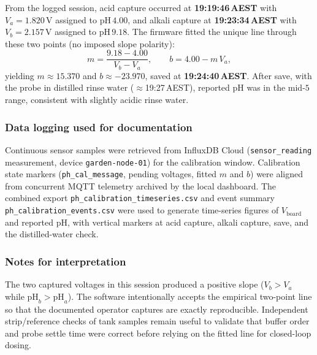 From the logged session, acid capture occurred at
\textbf{19:19:46\,AEST} with
$V_a = 1.820\,\mathrm{V}$ assigned to $\mathrm{pH}\,4.00$, and alkali
capture at \textbf{19:23:34\,AEST} with
$V_b = 2.157\,\mathrm{V}$ assigned to $\mathrm{pH}\,9.18$.
The firmware fitted the unique line through these two points
(no imposed slope polarity):
\begin{equation}
  m = \frac{9.18-4.00}{V_b-V_a},\qquad
  b = 4.00 - m\,V_a,
\end{equation}
yielding $m \approx 15.370$ and $b \approx -23.970$, saved at
\textbf{19:24:40\,AEST}. After save, with the probe in distilled rinse water
(\(\approx\)19:27\,AEST), reported $\mathrm{pH}$ was in the mid-$5$ range,
consistent with slightly acidic rinse water.

\subsubsection{Data logging used for documentation}
Continuous sensor samples were retrieved from InfluxDB Cloud
(\texttt{sensor\_reading} measurement, device \texttt{garden-node-01}) for
the calibration window. Calibration state markers
(\texttt{ph\_cal\_message}, pending voltages, fitted $m$ and $b$) were
aligned from concurrent MQTT telemetry archived by the local dashboard.
The combined export
\texttt{ph\_calibration\_timeseries.csv} and event summary
\texttt{ph\_calibration\_events.csv} were used to generate time-series
figures of $V_{\mathrm{board}}$ and reported $\mathrm{pH}$, with vertical
markers at acid capture, alkali capture, save, and the distilled-water
check.

\subsubsection{Notes for interpretation}
The two captured voltages in this session produced a positive slope
($V_b>V_a$ while $\mathrm{pH}_b>\mathrm{pH}_a$). The software intentionally
accepts the empirical two-point line so that the documented operator
captures are exactly reproducible. Independent strip/reference checks of
tank samples remain useful to validate that buffer order and probe settle
time were correct before relying on the fitted line for closed-loop dosing.

